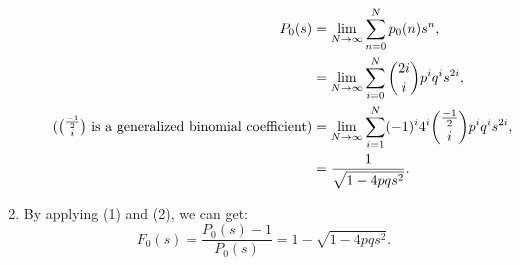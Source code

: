 \documentclass{huhtakm-template-book-v2}
\begin{document}
\begin{proofing}
\begin{enumerate}
\begin{align*}
                P_{0}(s) &= \lim_{N \to \infty}\sum_{n = 0}^{N}p_{0}(n)s^{n},\\
                &= \lim_{N \to \infty}\sum_{i = 0}^{N}\binom{2i}{i}p^{i}q^{i}s^{2i},\\
                \tag{$\binom{\frac{-1}{2}}{i}$ is a generalized binomial coefficient}
                &= \lim_{N \to \infty}\sum_{i = 1}^{N}(-1)^{i}4^{i}\binom{\frac{-1}{2}}{i}p^{i}q^{i}s^{2i},\\
                &= \frac{1}{\sqrt{1-4pqs^{2}}}.
            \end{align*}
            \item By applying (1) and (2), we can get:
            \begin{equation*}
                F_{0}(s) = \frac{P_{0}(s)-1}{P_{0}(s)} = 1-\sqrt{1-4pqs^{2}}.
            \end{equation*}
        \end{enumerate}
    \end{proofing}
    \newpage
\end{document}
